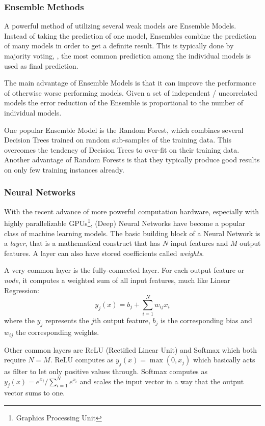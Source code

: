 \subsubsection{Ensemble Methods}
A powerful method of utilizing several weak models are Ensemble Models.
Instead of taking the prediction of one model, Ensembles combine the prediction of many models in order to get a definite result.
This is typically done by majority voting, \ie, the most common prediction among the individual models is used as final prediction.

The main advantage of Ensemble Models is that it can improve the performance of otherwise worse performing models.
Given a set of independent / uncorrelated models the error reduction of the Ensemble is proportional to the number of individual models.

One popular Ensemble Model is the Random Forest, which combines several Decision Trees trained on random sub-samples of the training data.
This overcomes the tendency of Decision Trees to over-fit on their training data.
Another advantage of Random Forests is that they typically produce good results on only few training instances already.

\subsubsection{Neural Networks}
With the recent advance of more powerful computation hardware, especially with highly parallelizable GPUs\footnote{Graphics Processing Unit}, (Deep) Neural Networks have become a popular class of machine learning models.
The basic building block of a Neural Network is a \emph{layer}, that is a mathematical construct that has $N$ input features and $M$ output features.
A layer can also have stored coefficients called \emph{weights}.

A very common layer is the fully-connected layer.
For each output feature or \emph{node}, it computes a weighted sum of all input features, much like Linear Regression:
\[
y_j(x) = b_j + \sum^{N}_{i = 1} w_{ij} x_i
\]
where the $y_j$ represents the $j$th output feature, $b_j$ is the corresponding bias and $w_{ij}$ the corresponding weights.

Other common layers are ReLU (Rectified Linear Unit) and Softmax which both require $N = M$.
ReLU computes as $y_j(x) = \max{(0, x_j)}$ which basically acts as filter to let only positive values through.
Softmax computes as $y_j(x) = e^{x_j} / \sum^{N}_{i = 1} e^{x_i}$ and scales the input vector in a way that the output vector sums to one.


